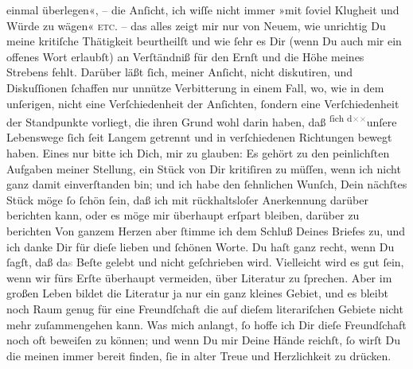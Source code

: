 \begin{ledgroupsized}[t]{13cm}
               einmal überlegen«, – die Anſicht, ich wiſſe nicht immer »mit ſoviel Klugheit und
               Würde zu wägen« \textsc{etc.} – das alles zeigt mir nur von Neuem,
               wie unrichtig Du  meine kritiſche Thätigkeit
               beurtheilſt und \strikeout{\textcolor{gray}{mit}} wie ſehr es Dir (wenn Du auch mir ein offenes Wort erlaubſt) an Verſtändniß
               für den Ernſt und die Höhe meines Strebens fehlt. Darüber läßt ſich, meiner Anſicht,
               nicht diskutiren, und Diskuſſionen ſchaffen nur 
               unnütze Verbitterung in einem Fall, wo, wie in dem {\pb}unſerigen, nicht eine Verſchiedenheit der Anſichten, ſondern eine Verſchiedenheit
               der Standpunkte vorliegt, die ihren Grund wohl darin haben, daß \substVorne{}\textsuperscript{ſich d\textcolor{gray}{×}\-\textcolor{gray}{×}}{\allowbreak}\substDazwischen{}unſere\substHinten{} Lebenswege ſich ſeit Langem getrennt und in verſchiedenen Richtungen bewegt
               haben.\pend
           \pstart
           Eines nur bitte ich Dich, mir zu glauben: Es gehört zu den peinlichſten Aufgaben
               meiner Stellung, ein Stück von Dir \strikeout{\textcolor{gray}{×}} kritiſiren zu müſſen, wenn ich nicht ganz damit einverſtanden bin; und ich
               habe den ſehnlichen Wunſch, Dein nächſtes Stück möge ſo ſchön ſein, daß ich mit
               rückhaltsloſer Anerkennung darüber berichten kann, oder es \strikeout{\textcolor{gray}{×}} möge mir überhaupt erſpart bleiben, darüber zu berichten{\dotsfive}\pend
           \pstart
           Von ganzem Herzen  aber ſtimme ich dem Schluß Deines Briefes zu, und ich danke Dir für dieſe
               lieben {\pb}und ſchönen Worte. Du haſt ganz recht, wenn
               Du ſagſt, daß da\textcolor{gray}{s} Beſte gelebt und nicht geſchrieben wird.
               Vielleicht wird es gut ſein, wenn wir fürs Erſte überhaupt vermeiden, über Literatur
               zu ſprechen. Aber im großen Leben bildet die Literatur ja nur ein ganz kleines
               Gebiet, und es bleibt noch Raum genug für eine Freundſchaft die auf dieſem
               literariſchen Gebiete nicht mehr zuſammengehen kann. Was mich anlangt, ſo hoffe ich
               Dir dieſe Freundſchaft noch oft beweiſen zu können; und  wenn Du mir Deine Hände reichſt, ſo wirſt Du die meinen immer bereit
               finden, ſie \strikeout{\textcolor{gray}{×}\-\textcolor{gray}{×}\-\textcolor{gray}{×}} in alter Treue und Herzlichkeit zu drücken.\pend
           \pstart

\end{ledgroupsized}
